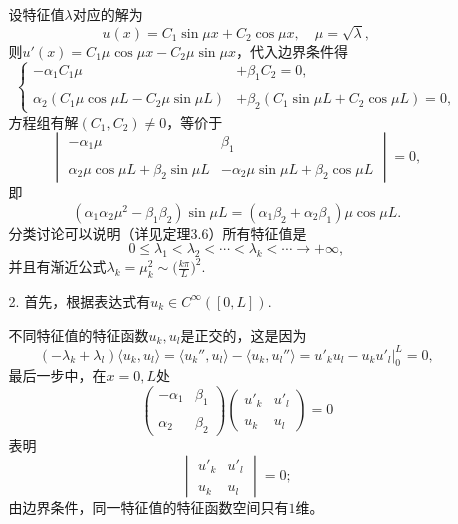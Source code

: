 \begin{itemize}
\begin{itemize}
    设特征值$\lambda$对应的解为
    $$u(x)=C_1\sin\mu x+C_2\cos\mu x,\quad\mu=\sqrt{\lambda},$$
    则$u'(x)=C_1\mu\cos\mu x-C_2\mu\sin\mu x$，代入边界条件得
    $$\left\{\begin{aligned}
        -\alpha_1C_1\mu&+\beta_1C_2=0,\\ & \\
        \alpha_2(C_1\mu\cos\mu L-C_2\mu\sin\mu L)
        &+\beta_2(C_1\sin\mu L+C_2\cos\mu L)=0,
    \end{aligned}\right.$$
    方程组有解$(C_1,C_2)\ne0$，等价于
    $$\begin{vmatrix}
        -\alpha_1\mu&\beta_1\\ & \\
        \alpha_2\mu\cos\mu L+\beta_2\sin\mu L
        &-\alpha_2\mu\sin\mu L+\beta_2\cos\mu L
    \end{vmatrix}=0,$$
    即
    $$(\alpha_1\alpha_2\mu^2-\beta_1\beta_2)\sin\mu L
    =(\alpha_1\beta_2+\alpha_2\beta_1)\mu\cos\mu L.$$
    分类讨论可以说明（详见\cite{Zh}定理3.6）所有特征值是
    $$0\leqslant\lambda_1<\lambda_2<\cdots<\lambda_k<\cdots\to+\infty,$$
    并且有渐近公式$\lambda_k=\mu_k^2\sim\big(\frac{k\pi}{L}\big)^2$.
    \item[2.]首先，根据表达式有$u_k\in C^\infty([0,L])$.
    
    不同特征值的特征函数$u_k,u_l$是正交的，这是因为
    $$(-\lambda_k+\lambda_l)\langle u_k,u_l\rangle
    =\langle u_k'',u_l\rangle-\langle u_k,u_l''\rangle
    =u'_ku_l-u_ku'_l\big|_0^L=0,$$
    最后一步中，在$x=0,L$处
    $$\begin{pmatrix}
    -\alpha_1&\beta_1\\ & \\
    \alpha_2&\beta_2\end{pmatrix}
    \begin{pmatrix}
    u'_k&u'_l\\ & \\u_k&u_l
    \end{pmatrix}=0$$
    表明
    $$\begin{vmatrix}u'_k&u'_l\\ & \\u_k&u_l\end{vmatrix}=0;$$
    由边界条件，同一特征值的特征函数空间只有$1$维。


\end{itemize}
\end{itemize}
